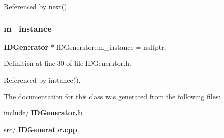 Referenced by next().

\mbox{\label{class_i_d_generator_a8e96b71a6ddef5c9a2919d0338c00b16}} 
\subsubsection{m\+\_\+instance}
{\footnotesize\ttfamily \textbf{ I\+D\+Generator} $\ast$ I\+D\+Generator\+::m\+\_\+instance = nullptr\hspace{0.3cm}{\ttfamily [static]}, {\ttfamily [private]}}



Definition at line 30 of file I\+D\+Generator.\+h.



Referenced by instance().



The documentation for this class was generated from the following files\+:\begin{DoxyCompactItemize}
\item 
include/\textbf{ I\+D\+Generator.\+h}\item 
src/\textbf{ I\+D\+Generator.\+cpp}\end{DoxyCompactItemize}
